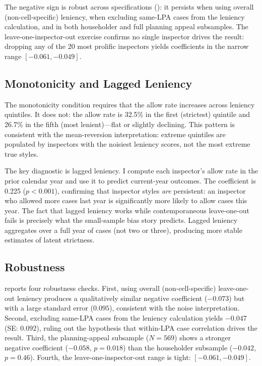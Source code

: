 \documentclass[12pt]{article}
\begin{document}
The negative sign is robust across specifications (): it persists when using overall (non-cell-specific) leniency, when excluding same-LPA cases from the leniency calculation, and in both householder and full planning appeal subsamples. The leave-one-inspector-out exercise confirms no single inspector drives the result: dropping any of the 20 most prolific inspectors yields coefficients in the narrow range $[-0.061, -0.049]$.



\subsection{Monotonicity and Lagged Leniency}

The monotonicity condition requires that the allow rate increases across leniency quintiles. It does not: the allow rate is 32.5\% in the first (strictest) quintile and 26.7\% in the fifth (most lenient)---flat or slightly declining. This pattern is consistent with the mean-reversion interpretation: extreme quintiles are populated by inspectors with the noisiest leniency scores, not the most extreme true styles.

The key diagnostic is lagged leniency. I compute each inspector's allow rate in the prior calendar year and use it to predict current-year outcomes. The coefficient is 0.225 ($p < 0.001$), confirming that inspector styles \textit{are} persistent: an inspector who allowed more cases last year is significantly more likely to allow cases this year. The fact that lagged leniency works while contemporaneous leave-one-out fails is precisely what the small-sample bias story predicts. Lagged leniency aggregates over a full year of cases (not two or three), producing more stable estimates of latent strictness.



\subsection{Robustness}

 reports four robustness checks. First, using overall (non-cell-specific) leave-one-out leniency produces a qualitatively similar negative coefficient ($-0.073$) but with a large standard error ($0.095$), consistent with the noise interpretation. Second, excluding same-LPA cases from the leniency calculation yields $-0.047$ (SE: $0.092$), ruling out the hypothesis that within-LPA case correlation drives the result. Third, the planning-appeal subsample ($N = 569$) shows a stronger negative coefficient ($-0.058$, $p = 0.018$) than the householder subsample ($-0.042$, $p = 0.46$). Fourth, the leave-one-inspector-out range is tight: $[-0.061, -0.049]$.
\end{document}
